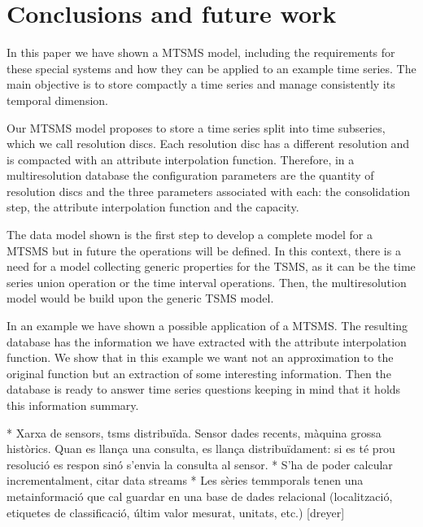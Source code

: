 \section{Conclusions and future work} 

In this paper we have shown a MTSMS model, including the requirements
for these special systems and how they can be applied to an example
time series. The main objective is to store compactly a time series
and manage consistently its temporal dimension.

Our MTSMS model proposes to store a time series split into time
subseries, which we call resolution discs.  Each resolution disc has a
different resolution and is compacted with an attribute interpolation
function. Therefore, in a multiresolution database the configuration
parameters are the quantity of resolution discs and the three
parameters associated with each: the consolidation step, the attribute
interpolation function and the capacity.

The data model shown is the first step to develop a complete model for
a MTSMS but in future the operations will be defined. In this context,
there is a need for a model collecting generic properties for the
TSMS, as it can be the time series union operation or the time
interval operations. Then, the multiresolution model would be build
upon the generic TSMS model.

In an example we have shown a possible application of a MTSMS. The
resulting database has the information we have extracted with the
attribute interpolation function. We show that in this example we want
not an approximation to the original function but an extraction of
some interesting information. Then the database is ready to answer
time series questions keeping in mind that it holds this information
summary.

* Xarxa de sensors, tsms distribuïda. Sensor dades recents, màquina grossa històrics. Quan es llança una consulta, es llança distribuïdament: si es té prou resolució es respon sinó s'envia la consulta al sensor.
* S'ha de poder calcular incrementalment, citar data streams
* Les sèries temmporals tenen una metainformació que cal guardar en una base de dades relacional (localització, etiquetes de classificació, últim valor mesurat, unitats, etc.) [dreyer]


